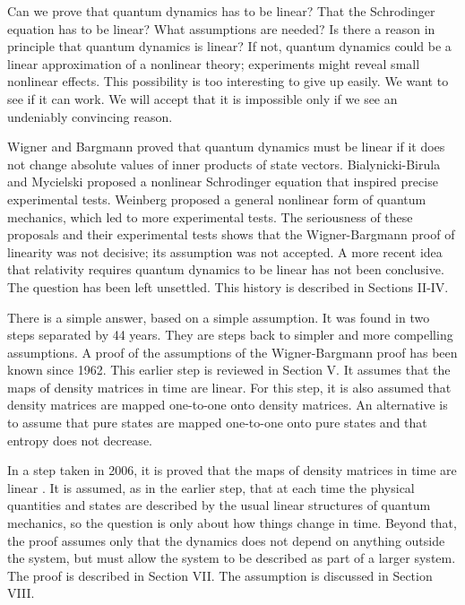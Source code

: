 \documentclass[pra, 12pt, showkeys, eqsecnum]{revtex4}
\begin{document}
Can we prove that quantum dynamics has to be linear? That the Schrodinger equation has to be linear? What assumptions are needed? Is there a reason in principle that quantum dynamics is linear? If not, quantum dynamics could be a linear approximation of a nonlinear theory; experiments might reveal small nonlinear effects. This possibility is too interesting to give up easily. We want to see if it can work. We will accept that it is impossible only if we see an undeniably convincing reason. 

Wigner and Bargmann proved\cite{WignerGroupTheory,Bargmann64} that quantum dynamics must be linear if it does not change absolute values of inner products of state vectors. Bialynicki-Birula and Mycielski\cite{BirulaMycielski} proposed a nonlinear Schrodinger equation that inspired precise experimental tests\cite{Shimony,ShullEtAl,GahlerEtAl}. Weinberg\cite{WeinbergNlqAnn,WeinbergNlqPrl} proposed a general nonlinear form of quantum mechanics, which led to more experimental tests\cite{Bollinger,Chupp,Walsworth,Majumder}. The seriousness of these proposals and their experimental tests shows that the Wigner-Bargmann proof of linearity was not decisive; its assumption was not accepted. A more recent idea that relativity requires quantum dynamics to be linear \cite{GisinHPA,GisinExample,GisinX3} has not been conclusive. The question has been left unsettled. This history is described in Sections II-IV.

There is a simple answer, based on a simple assumption. It was found in two steps separated by 44 years. They are steps back to simpler and more compelling assumptions. A proof of the assumptions of the Wigner-Bargmann proof has been known\cite{jordan62,Kadison,Hunziker,Simon} since 1962. This earlier step is reviewed in Section V. It assumes that the maps of density matrices in time are linear. For this step, it is also assumed that density matrices are mapped one-to-one onto density matrices. An alternative is to assume that pure states are mapped one-to-one onto pure states and that entropy does not decrease.

In a step taken in 2006, it is proved that the maps of density matrices in time are linear \cite{me80}. It is assumed, as in the earlier step, that at each time the physical quantities and states are described by the usual linear structures of quantum mechanics, so the question is only about how things change in time. Beyond that, the proof assumes only that the dynamics does not depend on anything outside the system, but must allow the system to be described as part of a larger system. The proof is described in Section VII. The assumption is discussed in Section VIII.
\end{document}
